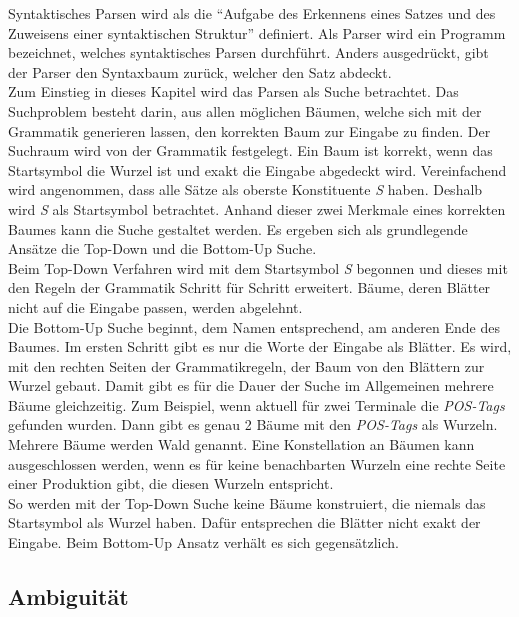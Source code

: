 Syntaktisches Parsen wird als die ``Aufgabe des Erkennens eines Satzes und des Zuweisens einer syntaktischen Struktur''\cite[S. 461]{nlpGrundlagen} definiert.
Als Parser wird ein Programm bezeichnet, welches syntaktisches Parsen durchführt. Anders ausgedrückt, gibt der Parser den Syntaxbaum zurück, welcher den Satz abdeckt. \\
Zum Einstieg in dieses Kapitel wird das Parsen als Suche betrachtet. Das Suchproblem besteht darin, aus allen möglichen Bäumen, welche sich mit der Grammatik generieren lassen, den korrekten Baum zur Eingabe zu finden. Der Suchraum wird von der Grammatik festgelegt. Ein Baum ist korrekt, wenn das Startsymbol die Wurzel ist und exakt die Eingabe abgedeckt wird. Vereinfachend wird angenommen, dass alle Sätze als oberste Konstituente \textit{S} haben. Deshalb wird \textit{S} als Startsymbol betrachtet. Anhand dieser zwei Merkmale eines korrekten Baumes kann die Suche gestaltet werden. Es ergeben sich als grundlegende Ansätze die Top-Down und die Bottom-Up Suche. \\
Beim Top-Down Verfahren wird mit dem Startsymbol \textit{S} begonnen und dieses mit den Regeln der Grammatik Schritt für Schritt erweitert. Bäume, deren Blätter nicht auf die Eingabe passen, werden abgelehnt. \\
Die Bottom-Up Suche beginnt, dem Namen entsprechend, am anderen Ende des Baumes. Im ersten Schritt gibt es nur die Worte der Eingabe als Blätter. Es wird, mit den rechten Seiten der Grammatikregeln, der Baum von den Blättern zur Wurzel gebaut. Damit gibt es für die Dauer der Suche im Allgemeinen mehrere Bäume gleichzeitig. Zum Beispiel, wenn aktuell für zwei Terminale die \textit{POS-Tags} gefunden wurden. Dann gibt es genau 2 Bäume mit den \textit{POS-Tags} als Wurzeln. Mehrere Bäume werden Wald genannt.
Eine Konstellation an Bäumen kann ausgeschlossen werden, wenn es für keine benachbarten Wurzeln eine rechte Seite einer Produktion gibt, die diesen Wurzeln entspricht. \\
So werden mit der Top-Down Suche keine Bäume konstruiert, die niemals das Startsymbol als Wurzel haben. Dafür entsprechen die Blätter nicht exakt der Eingabe. Beim Bottom-Up Ansatz verhält es sich gegensätzlich.
\subsection{Ambiguität}

